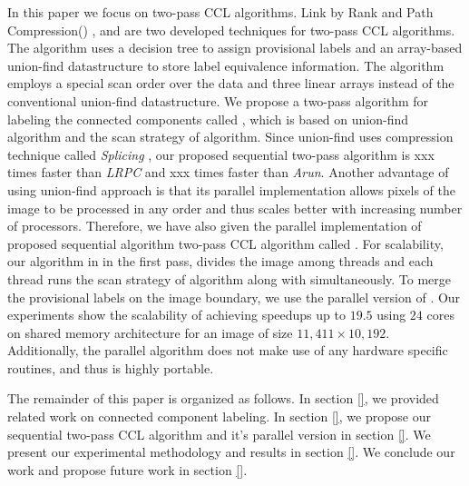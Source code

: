 In this paper we focus on two-pass CCL algorithms. Link by Rank and Path Compression(\lrpc) \cite{}, and \arun \cite{}
are two developed techniques for two-pass CCL algorithms.
The \lrpc algorithm uses a decision tree to assign provisional labels and an array-based union-find datastructure
to store label equivalence information. The \arun algorithm employs a special scan order over the data and three linear
arrays instead of the conventional union-find datastructure. 
We propose a two-pass algorithm for labeling the connected components called \aremsp, which is based on \rems union-find algorithm \cite{}
and the scan strategy of \arun algorithm. Since \rems union-find uses compression technique called {\em Splicing} \cite{},
our proposed sequential two-pass algorithm \aremsp is xxx times faster than {\em LRPC} and xxx times faster than {\em Arun}.
Another advantage of using \rems union-find approach is that its parallel implementation allows pixels of the image to be
processed in any order and thus scales better with increasing number of processors. Therefore, we have also given the parallel implementation of proposed
sequential algorithm two-pass CCL algorithm called \paremsp. For scalability, our algorithm in in the first pass, divides the image among threads
and each thread runs the scan strategy of \arun algorithm along with \remsp simultaneously. To merge the provisional labels on the image boundary,
we use the parallel version of \remsp \cite{}. Our experiments show the scalability of \paremsp achieving speedups up to $19.5$ using $24$ cores
on shared memory architecture for an image of size $11,411 \times 10,192$.
Additionally, the parallel algorithm does not make use of any hardware specific routines, and thus is highly portable.

The remainder of this paper is organized as follows. In section \ref{}, we provided related work on connected component labeling.
In section \ref{}, we propose our sequential two-pass CCL algorithm \aremsp and it's parallel version in section \ref{}. We present our experimental
methodology and results in section \ref{}. We conclude our work
and propose future work in section \ref{}.



